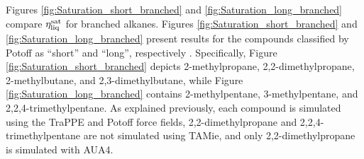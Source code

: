 \documentclass[preprint,review,12pt]{elsarticle}
\begin{document}
	
	Figures \ref{fig:Saturation_short_branched} and \ref{fig:Saturation_long_branched} compare $\eta_{\rm liq}^{\rm sat}$ for branched alkanes. Figures \ref{fig:Saturation_short_branched} and \ref{fig:Saturation_long_branched} present results for the compounds classified by Potoff as ``short'' and ``long'', respectively \cite{Mie}. Specifically, Figure \ref{fig:Saturation_short_branched} depicts 2-methylpropane, 2,2-dimethylpropane, 2-methylbutane, and 2,3-dimethylbutane, while Figure \ref{fig:Saturation_long_branched} contains 2-methylpentane, 3-methylpentane, and 2,2,4-trimethylpentane. As explained previously, each compound is simulated using the TraPPE and Potoff force fields, 2,2-dimethylpropane and 2,2,4-trimethylpentane are not simulated using  TAMie, and only 2,2-dimethylpropane is simulated with AUA4.
	
	
\end{document}

